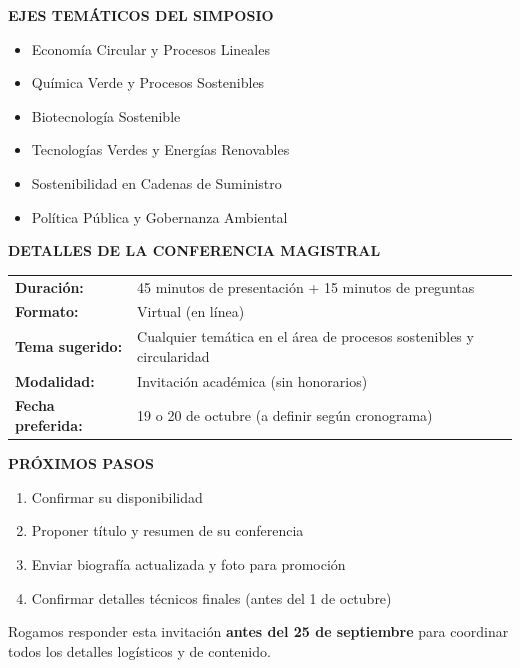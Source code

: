 \documentclass[12pt,a4paper]{article}
\begin{document}
\vspace{0.5cm}

\noindent
\textbf{EJES TEMÁTICOS DEL SIMPOSIO}

\begin{itemize}
  \item Economía Circular y Procesos Lineales
  \item Química Verde y Procesos Sostenibles
  \item Biotecnología Sostenible
  \item Tecnologías Verdes y Energías Renovables
  \item Sostenibilidad en Cadenas de Suministro
  \item Política Pública y Gobernanza Ambiental
\end{itemize}

\vspace{0.5cm}

\noindent
\textbf{DETALLES DE LA CONFERENCIA MAGISTRAL}

\begin{tabular}{ll}
\textbf{Duración:} & 45 minutos de presentación + 15 minutos de preguntas \\
\textbf{Formato:} & Virtual (en línea) \\
\textbf{Tema sugerido:} & Cualquier temática en el área de procesos sostenibles y circularidad \\
\textbf{Modalidad:} & Invitación académica (sin honorarios) \\
\textbf{Fecha preferida:} & 19 o 20 de octubre (a definir según cronograma) \\
\end{tabular}

\vspace{0.5cm}

\noindent
\textbf{PRÓXIMOS PASOS}

\begin{enumerate}
  \item Confirmar su disponibilidad
  \item Proponer título y resumen de su conferencia
  \item Enviar biografía actualizada y foto para promoción
  \item Confirmar detalles técnicos finales (antes del 1 de octubre)
\end{enumerate}

\vspace{0.8cm}

Rogamos responder esta invitación \textbf{antes del 25 de septiembre} para coordinar todos los detalles logísticos y de contenido.
\end{document}
